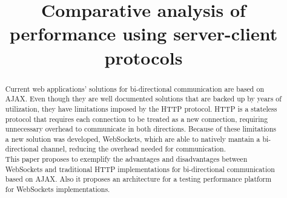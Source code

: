 \documentclass[conference]{IEEEtran}
\begin{document}
\title{Comparative analysis of performance using server-client protocols}

\author{
\and
{}
}

\maketitle

\begin{abstract}
Current web applications' solutions for bi-directional communication are based
on AJAX. Even though they are well documented solutions that are backed up by
years of utilization, they have limitations imposed by the HTTP protocol. HTTP
is a stateless protocol that requires each connection to be treated as a new
connection, requiring unnecessary overhead to communicate in both directions.
Because of these limitations a new solution was developed, WebSockets,
which are able to natively mantain a bi-directional channel, reducing the
overhead needed for communication.
\\
\indent
This paper proposes to exemplify the advantages and disadvantages between
WebSockets and traditional HTTP implementations for bi-directional communication
based on AJAX. Also it proposes an architecture for a testing performance platform
for WebSockets implementations.
\end{abstract}

\IEEEpeerreviewmaketitle

\end{document}
